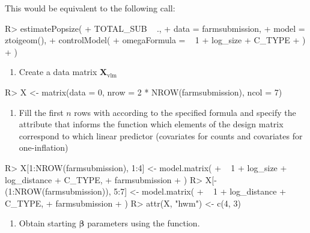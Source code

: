 \documentclass[
]{jss}
\providecommand{\tightlist}{%
  \setlength{\itemsep}{0pt}\setlength{\parskip}{0pt}}
\newcommand{\1}{\mathcal{I}} \newcommand{\bZero}{\boldsymbol{0}}
\begin{document}
This would be equivalent to the following  call:

\begin{CodeChunk}
\begin{CodeInput}
R> estimatePopsize(
+   TOTAL_SUB ~ .,
+   data = farmsubmission,
+   model = ztoigeom(),
+   controlModel(
+     omegaFormula = ~ 1 + log_size + C_TYPE
+   )
+ )
\end{CodeInput}
\end{CodeChunk}

\begin{enumerate}
\def\labelenumi{\arabic{enumi}.}
\tightlist
\item
  Create a data matrix \(\boldsymbol{X}_{\text{vlm}}\)
\end{enumerate}

\begin{CodeChunk}
\begin{CodeInput}
R> X <- matrix(data = 0, nrow = 2 * NROW(farmsubmission), ncol = 7)
\end{CodeInput}
\end{CodeChunk}

\begin{enumerate}
\def\labelenumi{\arabic{enumi}.}
\setcounter{enumi}{1}
\tightlist
\item
  Fill the first \(n\) rows with  according to the
  specified formula and specify the attribute  that
  informs the function which elements of the design matrix correspond to
  which linear predictor (covariates for counts and covariates for
  one-inflation)
\end{enumerate}

\begin{CodeChunk}
\begin{CodeInput}
R> X[1:NROW(farmsubmission), 1:4] <- model.matrix(
+   ~ 1 + log_size + log_distance + C_TYPE, 
+   farmsubmission
+ )
R> X[-(1:NROW(farmsubmission)), 5:7] <- model.matrix(
+   ~ 1 + log_distance + C_TYPE, 
+   farmsubmission
+ )
R> attr(X, "hwm") <- c(4, 3)
\end{CodeInput}
\end{CodeChunk}

\begin{enumerate}
\def\labelenumi{\arabic{enumi}.}
\setcounter{enumi}{2}
\tightlist
\item
  Obtain starting \(\boldsymbol{\beta}\) parameters using the
   function.
\end{enumerate}
\end{document}
